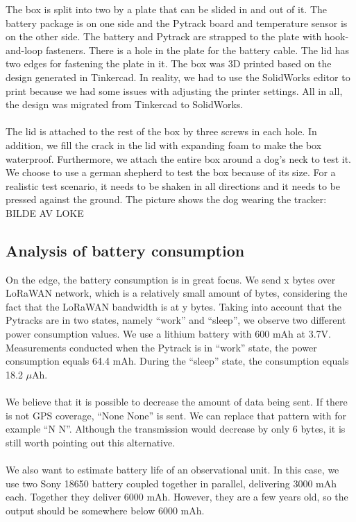 		The box is split into two by a plate that can be slided in and out of it. The battery package is on one side and the Pytrack board and temperature sensor is on the other side. The battery and Pytrack are strapped to the plate with hook-and-loop fasteners. There is a hole in the plate for the battery cable. The lid has two edges for fastening the plate in it. The box was 3D printed based on the design generated in Tinkercad. In reality, we had to use the SolidWorks editor to print because we had some issues with adjusting the printer settings. All in all, the design was migrated from Tinkercad to SolidWorks.
		\\\\
		The lid is attached to the rest of the box by three screws in each hole. In addition, we 
		fill the crack in the lid with expanding foam to make the box waterproof. Furthermore, we attach the entire box around a dog’s neck to test it. We choose to use a german shepherd to test the box because of its size. For a realistic test scenario, it needs to be shaken in all directions and it needs to be pressed against the ground. The picture shows the dog wearing the tracker:
		BILDE AV LOKE
		
	\subsection{Analysis of battery consumption}
		On the edge, the battery consumption is in great focus. We send x bytes over LoRaWAN network, which is a relatively small amount of bytes, considering the fact that the LoRaWAN bandwidth is at y bytes. Taking into account that the Pytracks are in two states, namely “work” and “sleep”, we observe two different power consumption values. We use a lithium battery with 600 mAh at 3.7V. Measurements conducted when the Pytrack is in “work” state, the power consumption equals 64.4 mAh. During the “sleep” state, the consumption equals 18.2 $\mu$Ah. 
		\\\\
		We believe that it is possible to decrease the amount of data being sent. If there is not GPS coverage, “None None” is sent. We can replace that pattern with for example “N N”. Although the transmission would decrease by only 6 bytes, it is still worth pointing out this alternative. 
		\\\\
		We also want to estimate battery life of an observational unit. In this case, we use two Sony 18650 battery coupled together in parallel, delivering 3000 mAh each. Together they deliver 6000 mAh. However, they are a few years old, so the output should be somewhere below 6000 mAh.
		
